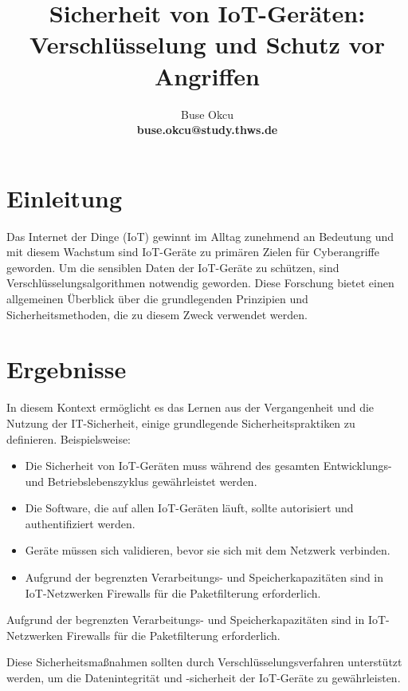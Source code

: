 \documentclass[12pt, parskip]{scrartcl}
\title{Sicherheit von IoT-Geräten: Verschlüsselung und Schutz vor Angriffen}
\author{Buse Okcu \\ \textbf{buse.okcu@study.thws.de}}
\date{}
\begin{document}
\maketitle	

\tableofcontents

\section{Einleitung}

Das Internet der Dinge (IoT) gewinnt im Alltag zunehmend an Bedeutung und mit diesem Wachstum sind IoT-Geräte zu primären Zielen für Cyberangriffe geworden. Um die sensiblen Daten der IoT-Geräte zu schützen, sind Verschlüsselungsalgorithmen notwendig geworden. Diese Forschung bietet einen allgemeinen Überblick über die grundlegenden Prinzipien und Sicherheitsmethoden, die zu diesem Zweck verwendet werden.

\section{Ergebnisse}

In diesem Kontext ermöglicht es das Lernen aus der Vergangenheit und die Nutzung der IT-Sicherheit, einige grundlegende Sicherheitspraktiken zu definieren. Beispielsweise:

\begin{itemize}[noitemsep, topsep=0pt]
    \item Die Sicherheit von IoT-Geräten muss während des gesamten Entwicklungs- und Betriebslebenszyklus gewährleistet werden.
    \item Die Software, die auf allen IoT-Geräten läuft, sollte autorisiert und authentifiziert werden.
    \item Geräte müssen sich validieren, bevor sie sich mit dem Netzwerk verbinden.
    \item Aufgrund der begrenzten Verarbeitungs- und Speicherkapazitäten sind in IoT-Netzwerken Firewalls für die Paketfilterung erforderlich.\cite{Gilchrist_2017}\\
\end{itemize}


Aufgrund der begrenzten Verarbeitungs- und Speicherkapazitäten sind in IoT-Netzwerken Firewalls für die Paketfilterung erforderlich.

Diese Sicherheitsmaßnahmen sollten durch Verschlüsselungsverfahren unterstützt werden, um die Datenintegrität und -sicherheit der IoT-Geräte zu gewährleisten.
\end{document}
